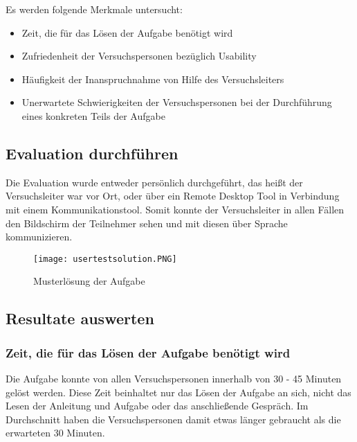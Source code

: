 Es werden folgende Merkmale untersucht:
\begin{itemize}
    \item Zeit, die für das Lösen der Aufgabe benötigt wird
    \item Zufriedenheit der Versuchspersonen bezüglich Usability
    \item Häufigkeit der Inanspruchnahme von Hilfe des Versuchsleiters
    \item Unerwartete Schwierigkeiten der Versuchspersonen bei der Durchführung eines konkreten Teils der Aufgabe
\end{itemize}

\subsection{Evaluation durchführen}
Die Evaluation wurde entweder persönlich durchgeführt, das heißt der Versuchsleiter war vor Ort, oder über ein Remote Desktop Tool in Verbindung mit einem Kommunikationstool. Somit konnte der Versuchsleiter in allen Fällen den Bildschirm der Teilnehmer sehen und mit diesen über Sprache kommunizieren.

\begin{figure}[H]
    \centering
    \texttt{[image: usertestsolution.PNG]}
    \caption{Musterlösung der Aufgabe}
    \label{fig:vuereactivity}
\end{figure}

\subsection{Resultate auswerten}

\subsubsection{Zeit, die für das Lösen der Aufgabe benötigt wird}
Die Aufgabe konnte von allen Versuchspersonen innerhalb von 30 - 45 Minuten gelöst werden. Diese Zeit beinhaltet nur das Lösen der Aufgabe an sich, nicht das Lesen der Anleitung und Aufgabe oder das anschließende Gespräch. Im Durchschnitt haben die Versuchspersonen damit etwas länger gebraucht als die erwarteten 30 Minuten.

